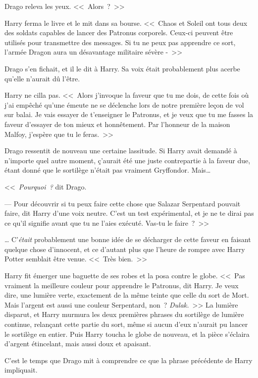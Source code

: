 Drago releva les yeux. <<~Alors~?~>>

Harry ferma le livre et le mit dans sa bourse. <<~Chaos et Soleil ont tous deux des soldats capables de lancer des Patronus corporels. Ceux-ci peuvent être utilisés pour transmettre des messages. Si tu ne peux pas apprendre ce sort, l'armée Dragon aura un désavantage militaire sévère -~>>

Drago s'en fichait, et il le dit à Harry. Sa voix était probablement plus acerbe qu'elle n'aurait dû l'être.

Harry ne cilla pas. <<~Alors j'invoque la faveur que tu me dois, de cette fois où j'ai empêché qu'une émeute ne se déclenche lors de notre première leçon de vol sur balai. Je vais essayer de t'enseigner le Patronus, et je veux que tu me fasses la faveur d'essayer de ton mieux et honnêtement. Par l'honneur de la maison Malfoy, j'espère que tu le feras.~>>

Drago ressentit de nouveau une certaine lassitude. Si Harry avait demandé à n'importe quel autre moment, ç'aurait été une juste contrepartie à la faveur due, étant donné que le sortilège n'était pas vraiment Gryffondor. Mais…

<<~\emph{Pourquoi~?} dit Drago.

--- Pour découvrir si tu peux faire cette chose que Salazar Serpentard pouvait faire, dit Harry d'une voix neutre. C'est un test expérimental, et je ne te dirai pas ce qu'il signifie avant que tu ne l'aies exécuté. Vas-tu le faire~?~>>

… C'\emph{était} probablement une bonne idée de se décharger de cette faveur en faisant quelque chose d'innocent, et ce d'autant plus que l'heure de rompre avec Harry Potter semblait être venue. <<~Très bien.~>>

Harry fit émerger une baguette de ses robes et la posa contre le globe. <<~Pas vraiment la meilleure couleur pour apprendre le Patronus, dit Harry. Je veux dire, une lumière verte, exactement de la même teinte que celle du sort de Mort. Mais l'argent est aussi une couleur Serpentard, non~? \emph{Dulak.}~>> La lumière disparut, et Harry murmura les deux premières phrases du sortilège de lumière continue, relançant cette partie du sort, même si aucun d'eux n'aurait pu lancer le sortilège en entier. Puis Harry toucha le globe de nouveau, et la pièce s'éclaira d'argent étincelant, mais aussi doux et apaisant.

C'est le temps que Drago mit à comprendre ce que la phrase précédente de Harry impliquait.


